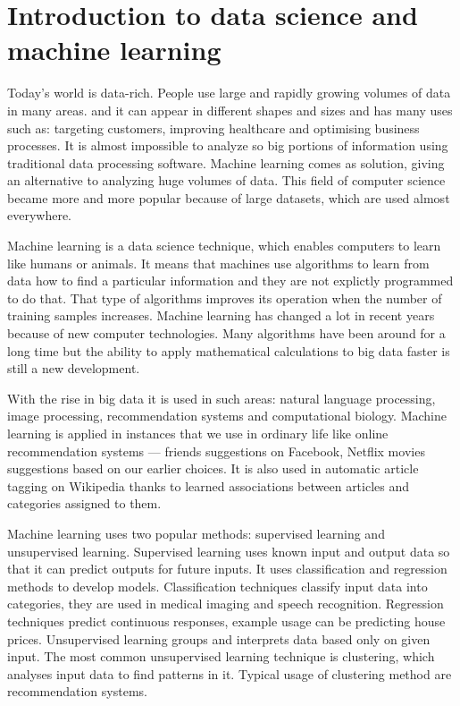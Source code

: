 \section{Introduction to data science and machine learning}

Today’s world is data-rich. 
People use large and rapidly growing volumes of data in many areas. 
 and it can appear in different shapes and sizes and has many uses such as: targeting customers, improving healthcare and optimising business processes. 
It is almost impossible to analyze so big portions of information using traditional data processing software.
Machine learning comes as solution, giving an alternative to analyzing huge volumes of data.
This field of computer science became more and more popular because of large datasets, which are used almost everywhere.

Machine learning is a data science technique, which enables computers to learn like humans or animals.
It means that machines use algorithms to learn from data how to find a particular information and
they are not explictly programmed to do that.
That type of algorithms improves its operation when the number of training samples increases.
Machine learning has changed a lot in recent years because of new computer technologies.
Many algorithms have been around for a long time but the ability to apply mathematical calculations to big data faster is still a new development.

With the rise in big data it is used in such areas: natural language processing, image processing, recommendation systems and computational biology. Machine learning is applied in instances that we use in ordinary life like online recommendation systems --- friends suggestions on Facebook, Netflix movies suggestions based on our earlier choices.
It is also used in automatic article tagging on Wikipedia thanks to learned
associations between articles and categories assigned to them.

Machine learning uses two popular methods: supervised learning and unsupervised learning.
Supervised learning  uses known input and output data so that it can predict outputs for future inputs.
It uses classification and regression methods to develop models.
Classification techniques classify input data into categories, they are used in medical imaging and speech recognition.
Regression techniques predict continuous responses, example usage can be predicting house prices. Unsupervised learning groups and interprets data based only on given input.
The most common unsupervised learning technique is clustering,
which analyses input data to find patterns in it. Typical usage of clustering method are recommendation systems.

